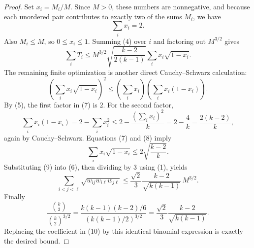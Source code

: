 \begin{proof}
Set $x_i=M_i/M$.  Since $M>0$, these numbers are nonnegative, and because
each unordered pair contributes to exactly two of the sums $M_i$, we have
\[
\sum_i x_i=2. \tag{5}
\]
Also $M_i\le M$, so $0\le x_i\le 1$.  Summing (4) over $i$ and factoring
out $M^{3/2}$ gives
\[
\sum_i T_i
\le
M^{3/2}\sqrt{\frac{k-2}{2(k-1)}}
\sum_i x_i\sqrt{1-x_i}. \tag{6}
\]
The remaining finite optimization is another direct Cauchy--Schwarz
calculation:
\[
\left(\sum_i x_i\sqrt{1-x_i}\right)^2
\le
\left(\sum_i x_i\right)
\left(\sum_i x_i(1-x_i)\right). \tag{7}
\]
By (5), the first factor in (7) is $2$.  For the second factor,
\[
\sum_i x_i(1-x_i)=2-\sum_i x_i^2
\le
2-\frac{(\sum_i x_i)^2}{k}
=2-\frac4k
=\frac{2(k-2)}k, \tag{8}
\]
again by Cauchy--Schwarz.  Equations (7) and (8) imply
\[
\sum_i x_i\sqrt{1-x_i}\le 2\sqrt{\frac{k-2}{k}}. \tag{9}
\]
Substituting (9) into (6), then dividing by $3$ using (1), yields
\[
\sum_{i<j<\ell}\sqrt{w_{ij}w_{i\ell}w_{j\ell}}
\le
\frac{\sqrt2}{3}\frac{k-2}{\sqrt{k(k-1)}}\,M^{3/2}. \tag{10}
\]
Finally
\[
\frac{\binom{k}{3}}{\binom{k}{2}^{3/2}}
=
\frac{k(k-1)(k-2)/6}{(k(k-1)/2)^{3/2}}
=
\frac{\sqrt2}{3}\frac{k-2}{\sqrt{k(k-1)}}.
\]
Replacing the coefficient in (10) by this identical binomial expression is
exactly the desired bound.
\end{proof}
